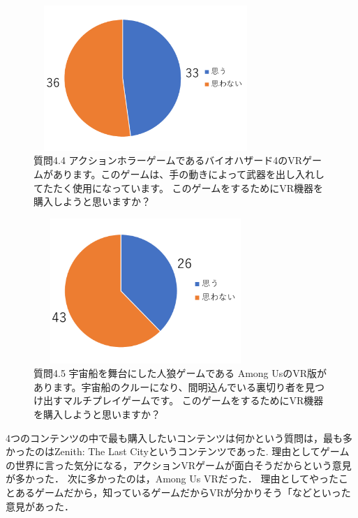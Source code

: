 \documentclass[12pt,a4j]{ltjsarticle}
\begin{document}
\begin{figure}[h]
\begin{center}
 \includegraphics[clip,width=85mm,height=55mm]{
 アンケート2_4_4.pdf}
\end{center}
 \caption{質問4.4 アクションホラーゲームであるバイオハザード4のVRゲームがあります。このゲームは、手の動きによって武器を出し入れしてたたく使用になっています。
このゲームをするためにVR機器を購入しようと思いますか？}
 \label{fig:アンケート2_4_4.pdf}
\end{figure}

\begin{figure}[h]
\begin{center}
 \includegraphics[clip,width=85mm,height=55mm]{
 アンケート2_4_5.pdf}
\end{center}
 \caption{質問4.5 宇宙船を舞台にした人狼ゲームである Among UsのVR版があります。宇宙船のクルーになり、間明込んでいる裏切り者を見つけ出すマルチプレイゲームです。
このゲームをするためにVR機器を購入しようと思いますか？}
 \label{fig:アンケート2_4_5.pdf}
\end{figure}

4つのコンテンツの中で最も購入したいコンテンツは何かという質問は，最も多かったのはZenith: The Last Cityというコンテンツであった.
理由としてゲームの世界に言った気分になる，アクションVRゲームが面白そうだからという意見が多かった．
次に多かったのは，Among Us VRだった．
理由としてやったことあるゲームだから，知っているゲームだからVRが分かりそう「などといった意見があった．
\end{document}
